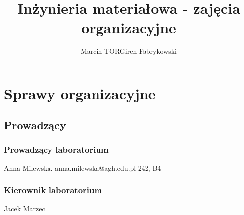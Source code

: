 \documentclass[a4paper,12pt]{article}
\title{Inżynieria materiałowa - zajęcia organizacyjne}
\author{Marcin TORGiren Fabrykowski}
\begin{document}
\maketitle
\newpage
\section{Sprawy organizacyjne}
\subsection{Prowadzący}
\subsubsection{Prowadzący laboratorium}
Anna Milewska.
anna.milewska@agh.edu.pl
242, B4
\subsubsection{Kierownik laboratorium}
Jacek Marzec
\end{document}
